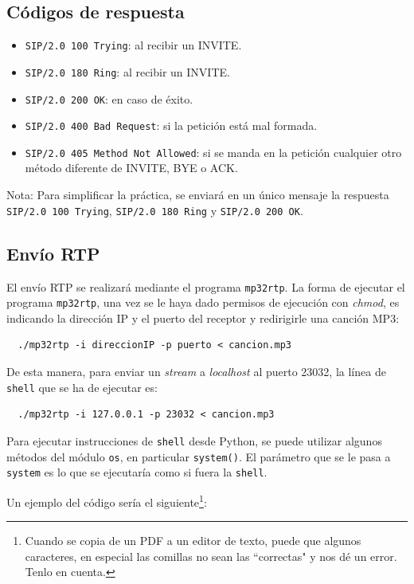 \documentclass[a4paper,11pt]{article}
\begin{document}
\subsection*{Códigos de respuesta}

   \begin{itemize}
     \item \texttt{SIP/2.0 100 Trying}: al recibir un INVITE.
     \item \texttt{SIP/2.0 180 Ring}: al recibir un INVITE.
     \item \texttt{SIP/2.0 200 OK}: en caso de éxito.
     \item \texttt{SIP/2.0 400 Bad Request}: si la petición está mal formada.
     \item \texttt{SIP/2.0 405 Method Not Allowed}: si se manda en la petición cualquier otro método diferente de INVITE, BYE o ACK.
   \end{itemize}

Nota: Para simplificar la práctica, se enviará en un único mensaje la respuesta \texttt{SIP/2.0 100 Trying}, \texttt{SIP/2.0 180 Ring} y \texttt{SIP/2.0 200 OK}.

\subsection*{Envío RTP}

El envío RTP se realizará mediante el programa \texttt{mp32rtp}. La forma de ejecutar el programa \texttt{mp32rtp}, una vez se le haya dado permisos de ejecución con \emph{chmod}, es indicando la dirección IP y el puerto del receptor y redirigirle una canción MP3:

\begin{verbatim}
  ./mp32rtp -i direccionIP -p puerto < cancion.mp3
\end{verbatim}

De esta manera, para enviar un \emph{stream} a \emph{localhost} al puerto 23032, la línea de \texttt{shell} que se ha de ejecutar es:

\begin{verbatim}
  ./mp32rtp -i 127.0.0.1 -p 23032 < cancion.mp3
\end{verbatim}

Para ejecutar instrucciones de \texttt{shell} desde Python, se puede utilizar algunos métodos del módulo \texttt{os}, en particular \texttt{system()}. El parámetro que se le pasa a \texttt{system} 
es lo que se ejecutaría como si fuera la \texttt{shell}.

Un ejemplo del código sería el siguiente\footnote{Cuando se copia de un PDF
a un editor de texto, puede que algunos caracteres, en especial las comillas
no sean las ``correctas" y nos dé un error. Tenlo en cuenta.}:
\end{document}
